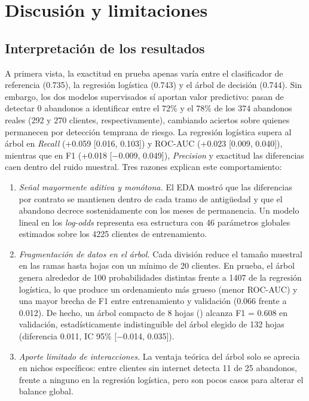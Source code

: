 \section{Discusión y limitaciones}
\label{sec:discusion}

\subsection{Interpretación de los resultados}
A primera vista, la exactitud en prueba apenas varía entre el clasificador de referencia (0.735), la
regresión logística (0.743) y el árbol de decisión (0.744). Sin embargo, los dos modelos supervisados
sí aportan valor predictivo: pasan de detectar 0 abandonos a identificar entre el 72\% y el 78\% de
los 374 abandonos reales (292 y 270 clientes, respectivamente), cambiando aciertos sobre quienes
permanecen por detección temprana de riesgo. La regresión logística supera al árbol en \emph{Recall}
(+0.059 [0.016, 0.103]) y ROC-AUC (+0.023 [0.009, 0.040]), mientras que en F1 (+0.018 [$-$0.009,
0.049]), \emph{Precision} y exactitud las diferencias caen dentro del ruido muestral. Tres razones
explican este comportamiento:

\begin{enumerate}
    \item \emph{Señal mayormente aditiva y monótona.} El EDA mostró que las diferencias por contrato
    se mantienen dentro de cada tramo de antigüedad y que el abandono decrece sostenidamente con los
    meses de permanencia. Un modelo lineal en los \emph{log-odds} representa esa estructura con 46
    parámetros globales estimados sobre los 4225 clientes de entrenamiento.

    \item \emph{Fragmentación de datos en el árbol.} Cada división reduce el tamaño muestral en las
    ramas hasta hojas con un mínimo de 20 clientes. En prueba, el árbol genera alrededor de 100
    probabilidades distintas frente a 1407 de la regresión logística, lo que produce un ordenamiento
    más grueso (menor ROC-AUC) y una mayor brecha de F1 entre entrenamiento y validación (0.066
    frente a 0.012). De hecho, un árbol compacto de 8 hojas () alcanza F1 = 0.608 en
    validación, estadísticamente indistinguible del árbol elegido de 132 hojas (diferencia 0.011,
    IC 95\% [$-$0.014, 0.035]).

    \item \emph{Aporte limitado de interacciones.} La ventaja teórica del árbol solo se aprecia en
    nichos específicos: entre clientes sin internet detecta 11 de 25 abandonos, frente a ninguno en
    la regresión logística, pero son pocos casos para alterar el balance global.
\end{enumerate}

